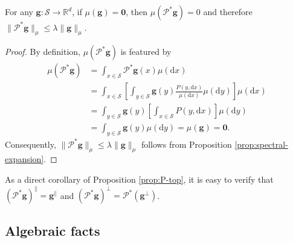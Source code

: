 \begin{customproposition}\label{prop:P-top}
For any $\bm{g}: \mathcal{S} \to \mathbb{R}^{d}$, if $\mu(\bm{g}) = \bm{0}$, then $\mu(\mathcal{P}^* \bm{g}) = 0$ and therefore $\|\mathcal{P}^{*} \bm{g}\|_{\mu} \leq \lambda \|\bm{g}\|_{\mu}$.
\end{customproposition}
\begin{proof} 
By definition, $\mu(\mathcal{P}^* \bm{g})$ is featured by
\begin{align*}
\mu(\mathcal{P}^* \bm{g}) &= \int_{x \in \mathcal{S}} \mathcal{P}^* \bm{g}(x) \mu(\mathrm{d}x) \\ 
&= \int_{x \in \mathcal{S}} \left[\int_{y \in \mathcal{S}} \bm{g}(y)\frac{P(y,\mathrm{d}x)}{\mu(\mathrm{d}x)}\mu(\mathrm{d}y)\right] \mu(\mathrm{d}x)\\ 
&= \int_{y \in \mathcal{S}} \bm{g}(y) \left[\int_{x \in \mathcal{S}} P(y,\mathrm{d}x) \right] \mu(\mathrm{d}y)\\ 
&= \int_{y \in \mathcal{S}} \bm{g}(y) \mu(\mathrm{d}y) = \mu(\bm{g}) = \bm{0}.
\end{align*}
Consequently, $\|\mathcal{P}^* \bm{g}\|_{\mu} \leq \lambda \|\bm{g}\|_{\mu}$ follows from Proposition \ref{prop:spectral-expansion}. 
\end{proof}

As a direct corollary of Proposition \ref{prop:P-top}, it is easy to verify that $(\mathcal{P}^* \bm{g})^{\parallel} = \bm{g}^{\parallel}$ and $(\mathcal{P}^* \bm{g})^{\perp} = \mathcal{P}^{*}(\bm{g}^{\perp})$. 



\subsection{Algebraic facts}

